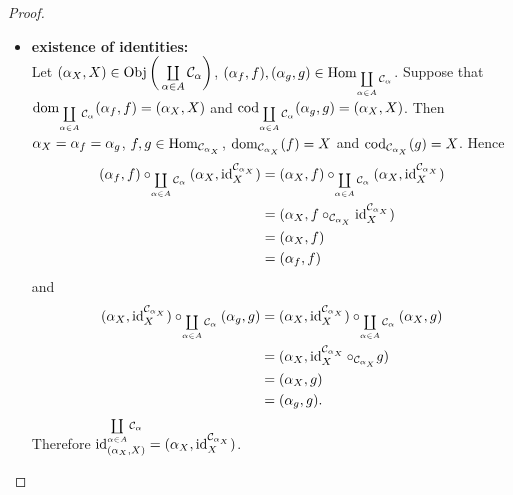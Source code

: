\documentclass{book}
\begin{document}
\begin{proof}
\begin{itemize}
\begin{align*}
				& = (\al_0, f_{34}) \circ_{\coprod\limits_{\al \in A} \MC_{\al}} (\al_0, f_{23} \circ_{\MC_{\al_0}} f_{12}) \\
				& = (\al_0, f_{34} \circ_{\MC_{\al_0}} [f_{23} \circ_{\MC_{\al_0}} f_{12}]) \\
				& = (\al_0, [f_{34} \circ_{\MC_{\al_0}} f_{23}] \circ_{\MC_{\al_0}} f_{12}) \\
				& = (\al_0, f_{34} \circ_{\MC_{\al_0}} f_{23}) \circ_{\coprod\limits_{\al \in A} \MC_{\al}} (\al_0, f_{12}) \\
				& = [(\al_0, f_{34}) \circ_{\coprod\limits_{\al \in A} \MC_{\al}} (\al_0, f_{23})] \circ_{\coprod\limits_{\al \in A} \MC_{\al}} (\al_0, f_{12}) \\
				& = [(\al_{34}, f_{34}) \circ_{\coprod\limits_{\al \in A} \MC_{\al}} (\al_{23}, f_{23})] \circ_{\coprod\limits_{\al \in A} \MC_{\al}} (\al_{21}, f_{12}).
			\end{align*}  
			Thus composition is associative. \\
			\item \textbf{existence of identities: } \\
			Let $(\alpha_X, X) \in \operatorname{Obj} \bigg(\coprod\limits_{\alpha \in A} \mathcal{C}_{\alpha} \bigg)$, $(\alpha_f, f), (\alpha_g, g) \in \operatorname{Hom}_{\coprod\limits_{\alpha \in A} \mathcal{C}_{\alpha}}$. Suppose that $\operatorname{dom}_{\coprod\limits_{\alpha \in A} \mathcal{C}_{\alpha}}(\alpha_f, f) = (\alpha_X, X)$ and $\operatorname{cod}_{\coprod\limits_{\alpha \in A} \mathcal{C}_{\alpha}}(\alpha_g, g) = (\alpha_X, X)$. Then $\alpha_X = \alpha_f = \alpha_g$, $f,g \in \operatorname{Hom}_{\mathcal{C}_{\alpha_X}}$, $\operatorname{dom}_{\mathcal{C}_{\alpha_X}}(f) = X$ and $\operatorname{cod}_{\mathcal{C}_{\alpha_X}} (g) = X$. Hence
			\begin{align*}
				(\alpha_f, f) \circ_{\coprod\limits_{\alpha \in A} \mathcal{C}_{\alpha}} (\alpha_X, \operatorname{id}_X^{\mathcal{C}_{\alpha_X}}) 
				& = (\alpha_X, f) \circ_{\coprod\limits_{\alpha \in A} \mathcal{C}_{\alpha}} (\alpha_X, \operatorname{id}_X^{\mathcal{C}_{\alpha_X}}) \\
				& = (\alpha_X, f \circ_{\mathcal{C}_{\alpha_X}} \operatorname{id}_X^{\mathcal{C}_{\alpha_X}}) \\
				& = (\alpha_X, f) \\
				& = (\alpha_f, f)
			\end{align*}
			and
			\begin{align*}
				(\alpha_X, \operatorname{id}_X^{\mathcal{C}_{\alpha_X}}) \circ_{\coprod\limits_{\alpha \in A} \mathcal{C}_{\alpha}} (\alpha_g, g)
				& = (\alpha_X, \operatorname{id}_X^{\mathcal{C}_{\alpha_X}}) \circ_{\coprod\limits_{\alpha \in A} \mathcal{C}_{\alpha}} (\alpha_X, g) \\
				& = (\alpha_X , \operatorname{id}_X^{\mathcal{C}_{\alpha_X}} \circ_{\mathcal{C}_{\alpha_X}} g) \\
				& = (\alpha_X, g) \\
				& = (\alpha_g, g).
			\end{align*}
			Therefore $\operatorname{id}_{(\alpha_X, X)}^{\coprod\limits_{\alpha \in A} \mathcal{C}_{\alpha}} = (\alpha_X, \operatorname{id}_X^{\mathcal{C}_{\alpha_X}})$.
		\end{itemize}
	\end{proof}
	
\end{document}
